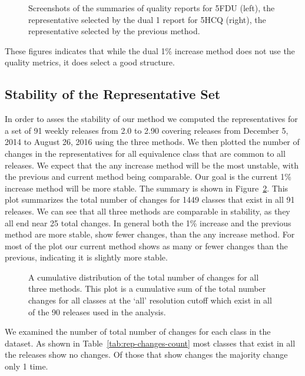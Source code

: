 \begin{figure}
  \caption{Screenshots of the summaries of quality reports for 5FDU (left), the
    representative selected by the dual 1%
    report for 5HCQ (right), the representative selected by the previous
  method.}
  \label{fig:tt-lsu-report}
\end{figure}

These figures indicates that while the dual 1\% increase method does not use the
quality metrics, it does select a good structure. 

\subsection{Stability of the Representative Set}

In order to asses the stability of our method we computed the representatives
for a set of 91 weekly releases from 2.0 to 2.90 covering releases from December
5, 2014 to August 26, 2016 using the three methods. We then plotted the number
of changes in the representatives for all equivalence class that are common to
all releases. We expect that the any increase method will be the most unstable,
with the previous and current method being comparable. Our goal is the current
1\% increase method will be more stable. The summary is shown in
Figure~\ref{fig:rep-changes}. This plot summarizes the total number of changes
for 1449 classes that exist in all 91 releases. We can see that all three
methods are comparable in stability, as they all end near 25 total changes. In
general both the 1\% increase and the previous method are more stable, show fewer
changes, than the any increase method. For most of the plot our current method
shows as many or fewer changes than the previous, indicating it is slightly more
stable. 

\begin{figure}
  \caption{A cumulative distribution of the total number of changes for all
    three methods. This plot is a cumulative sum of the total number changes for
    all classes at the ‘all’ resolution cutoff which exist in all of the 90
    releases used in the analysis.}
  \label{fig:rep-changes}
\end{figure}

We examined the number of total number of changes for each class in the dataset.
As shown in Table~\ref{tab:rep-changes-count} most classes that exist in all the
releases show no changes. Of those that show changes the majority change only 1
time. 

